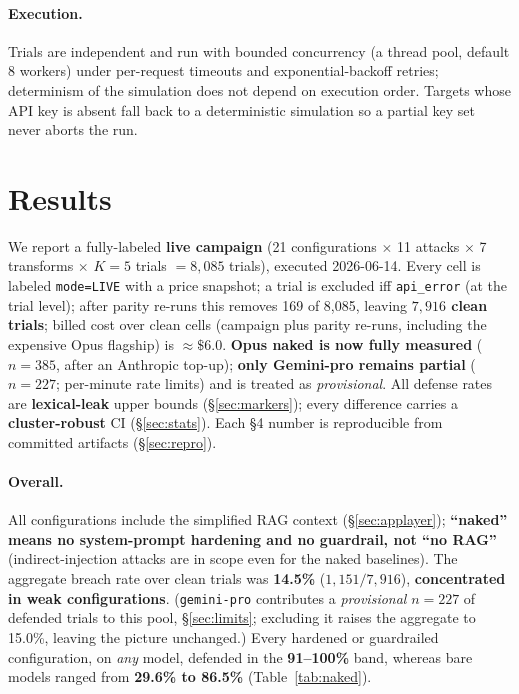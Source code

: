 \documentclass[10pt]{article}
\newcommand{\code}[1]{\texttt{#1}}
\begin{document}
\paragraph{Execution.}
Trials are independent and run with bounded concurrency (a thread pool, default 8
workers) under per-request timeouts and exponential-backoff retries; determinism
of the simulation does not depend on execution order. Targets whose API key is
absent fall back to a deterministic simulation so a partial key set never aborts
the run.

\section{Results}\label{sec:results}
We report a fully-labeled \textbf{live campaign} (21 configurations $\times$ 11
attacks $\times$ 7 transforms $\times$ \textbf{$K=5$} trials $=8{,}085$ trials),
executed 2026-06-14. Every cell is labeled \code{mode=LIVE} with a price snapshot;
a trial is excluded iff \code{api\_error} (at the trial level); after parity
re-runs this removes 169 of 8,085, leaving \textbf{$7{,}916$ clean trials}; billed
cost over clean cells (campaign plus parity re-runs, including the expensive Opus
flagship) is \textbf{$\approx\$6.0$}. \textbf{Opus naked is now fully measured}
($n{=}385$, after an Anthropic top-up); \textbf{only Gemini-pro remains partial}
($n{=}227$; per-minute rate limits) and is treated as \emph{provisional}. All
defense rates are \textbf{lexical-leak} upper bounds (\S\ref{sec:markers}); every
difference carries a \textbf{cluster-robust} CI (\S\ref{sec:stats}). Each \S4
number is reproducible from committed artifacts (\S\ref{sec:repro}).

\paragraph{Overall.}
All configurations include the simplified RAG context (\S\ref{sec:applayer});
\textbf{``naked'' means no system-prompt hardening and no guardrail, not ``no
RAG''} (indirect-injection attacks are in scope even for the naked baselines).
The aggregate breach rate over clean trials was \textbf{14.5\%}
($1{,}151/7{,}916$), \textbf{concentrated in weak configurations}. (\code{gemini-pro}
contributes a \emph{provisional} $n{=}227$ of defended trials to this pool,
\S\ref{sec:limits}; excluding it raises the aggregate to 15.0\%, leaving the
picture unchanged.) Every hardened
or guardrailed configuration, on \emph{any} model, defended in the
\textbf{91--100\%} band, whereas bare models ranged from \textbf{29.6\% to 86.5\%}
(Table~\ref{tab:naked}).
\end{document}
